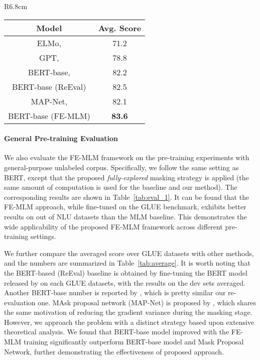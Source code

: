 \documentclass{article} \usepackage{iclr2021_conference,times}
\theoremstyle{plain}
\begin{document}
\begin{wraptable}{R}{6.8cm}
	\vspace{-2mm}
	\setlength{\tabcolsep}{6pt}
	\def\arraystretch{1.0}
	\begin{small}
		\begin{tabular}{c||c}
			\toprule[1.2pt]
			\textbf{Model}  & \textbf{Avg. Score} \\
			\hline
			ELMo, \citep{peters2018deep} & 71.2 \\
			GPT, \citep{radford2018improving} &  78.8 \\
			BERT-base, \citep{devlin2018bert} & 82.2 \\
			BERT-base (ReEval) & 82.5   \\
			MAP-Net, \citep{chen2020variance} & 82.1 \\
			\hline
			BERT-base (FE-MLM) & \textbf{83.6}   \\
			\bottomrule[1.2pt]
		\end{tabular}
	\end{small}
	\caption{The comparison between the FE-MLM model with several baseline methods, based on the averaged score (on the dev set) across different tasks from the GLUE benchmark. }\label{tab:average}
	\vspace{-3mm}
\end{wraptable}
\paragraph{General Pre-training Evaluation} We also evaluate the FE-MLM framework on the pre-training experiments with general-purpose unlabeled corpus. Specifically, we follow the same setting as BERT, except that the proposed \emph{fully-explored} masking strategy is applied (the same amount of computation is used for the baseline and our method). The corresponding results are shown in Table~\ref{tab:eval_1}. 
It can be found that the FE-MLM approach, while fine-tuned on the GLUE benchmark, exhibits better results on  out of  NLU datasets than the MLM baseline. This demonstrates the wide applicability of the proposed FE-MLM framework across different pre-training settings.

We further compare the averaged score over  GLUE datasets with other methods, and the numbers are summarized in Table~\ref{tab:average}. It is worth noting that the BERT-based (ReEval) baseline is obtained by fine-tuning the BERT model released by \cite{devlin2018bert} on each GLUE datasets, with the results on the dev sets averaged. Another BERT-base number is reported by \cite{clark2019electra}, which is pretty similar our re-evaluation one. MAsk proposal network (MAP-Net) is proposed by \cite{chen2020variance}, which shares the same motivation of reducing the gradient variance during the masking stage. However, we approach the problem with a distinct strategy based upon extensive theoretical analysis. We found that BERT-base model improved with the FE-MLM training significantly outperform BERT-base model and Mask Proposal Network, further demonstrating the effectiveness of proposed approach. 
\end{document}
